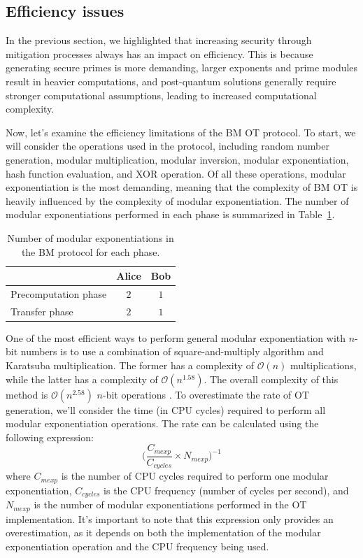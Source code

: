 \subsection{Efficiency issues}


In the previous section, we highlighted that increasing security through mitigation processes always has an impact on efficiency. This is because generating secure primes is more demanding, larger exponents and prime modules result in heavier computations, and post-quantum solutions generally require stronger computational assumptions, leading to increased computational complexity.

Now, let's examine the efficiency limitations of the BM OT protocol. To start, we will consider the operations used in the protocol, including random number generation, modular multiplication, modular inversion, modular exponentiation, hash function evaluation, and XOR operation. Of all these operations, modular exponentiation is the most demanding, meaning that the complexity of BM OT is heavily influenced by the complexity of modular exponentiation. The number of modular exponentiations performed in each phase is summarized in Table~\ref{table:BMOT_mexp}.

\begin{table}[h!]
\centering
\begin{tabular}{lcc}
\toprule
 & Alice & Bob \\
\midrule
\multicolumn{1}{l}{Precomputation phase}   & $2$  & $1$  \\
\multicolumn{1}{l}{Transfer phase} & $2$  & $1$\\
\bottomrule
\end{tabular}
\caption{Number of modular exponentiations in the BM protocol for each phase.}
\label{table:BMOT_mexp}
\end{table}


One of the most efficient ways to perform general modular exponentiation with $n$-bit numbers is to use a combination of square-and-multiply algorithm and Karatsuba multiplication. The former has a complexity of $\mathcal{O}(n)$ multiplications, while the latter has a complexity of $\mathcal{O}(n^{1.58})$. The overall complexity of this method is $\mathcal{O}(n^{2.58})$ $n$-bit operations \cite{MVV01}. To overestimate the rate of OT generation, we'll consider the time (in CPU cycles) required to perform all modular exponentiation operations. The rate can be calculated using the following expression:
\begin{equation}
\label{eq:nOTs}
\Big( \frac{C_{mexp}}{C_{cycles}} \times N_{mexp} \Big)^{-1}
\end{equation}
where $C_{mexp}$ is the number of CPU cycles required to perform one modular exponentiation, $C_{cycles}$ is the CPU frequency (number of cycles per second), and $N_{mexp}$ is the number of modular exponentiations performed in the OT implementation. It's important to note that this expression only provides an overestimation, as it depends on both the implementation of the modular exponentiation operation and the CPU frequency being used.


